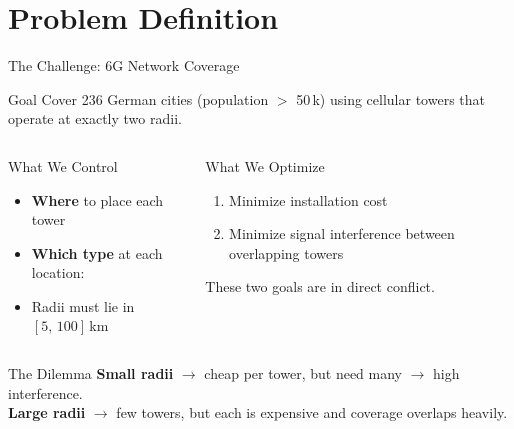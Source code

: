 \section{Problem Definition}

\begin{frame}[t]{The Challenge: 6G Network Coverage}{}
    \begin{center}
    \begin{minipage}{0.95\textwidth} %
        \begin{block}{Goal}
            Cover \alert{236 German cities} (population $>$ 50\,k) using cellular towers that operate at exactly \alert{two radii}.
        \end{block}
    \end{minipage}
    \end{center}

    \vspace{0.15cm}
    \begin{columns}[T]
        \begin{block}{What We Control}
            \begin{itemize}
                \item \textbf{Where} to place each tower
                \item \textbf{Which type} at each location:
                \item Radii must lie in $[5,\,100]$\,km
            \end{itemize}
        \end{block}

        \begin{block}{What We Optimize}
            \begin{enumerate}
                \item Minimize \alert{installation cost}
                \item Minimize \alert{signal interference} between overlapping towers
            \end{enumerate}
            \vspace{0.1cm}
            \begin{center}
                \small These two goals are in direct conflict.
            \end{center}
        \end{block}
    \end{columns}

    \vspace{0.2cm}
    \begin{alertblock}{The Dilemma}
        \textbf{Small radii} $\rightarrow$ cheap per tower, but need many $\rightarrow$ high interference.\\[2pt]
        \textbf{Large radii} $\rightarrow$ few towers, but each is expensive and coverage overlaps heavily.
    \end{alertblock}
\end{frame}

